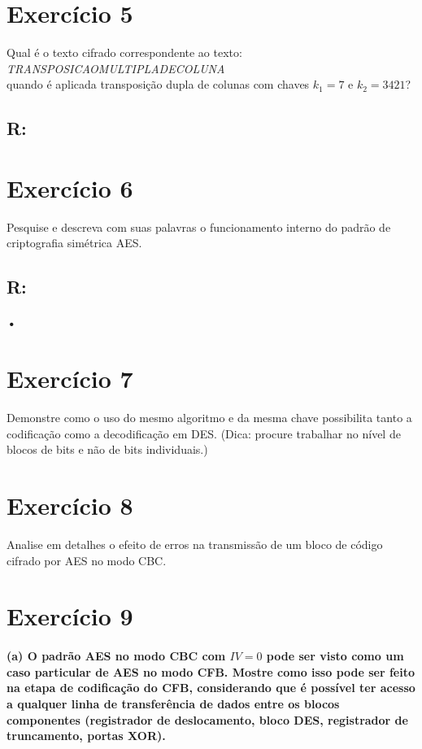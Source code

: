 \documentclass[10pt,a4paper]{article}
\begin{document}
\section*{Exercício 5}
Qual é o texto cifrado correspondente ao texto:\\ \emph{TRANSPOSICAOMULTIPLADECOLUNA}\\ quando é aplicada transposição dupla de colunas com chaves $k_1=7$ e $k_2= 3421$?
\subsection*{R:}
\section*{Exercício 6}
Pesquise e descreva com suas palavras o funcionamento interno do padrão de criptografia simétrica AES.
\subsection*{R:}
\paragraph*{•}
\section*{Exercício 7}
Demonstre como o uso do mesmo algoritmo e da mesma chave possibilita tanto a codificação como a decodificação em DES. (Dica: procure trabalhar no nível de blocos de bits e não de bits individuais.)
\section*{Exercício 8}
Analise em detalhes o efeito de erros na transmissão de um bloco de código cifrado por AES no modo CBC.
\section*{Exercício 9}
\paragraph*{(a) O padrão AES no modo CBC com $IV=0$ pode ser visto como um caso particular de AES no modo CFB. Mostre como isso pode ser feito na etapa de codificação do CFB, considerando que é possível ter acesso a qualquer linha de transferência de dados entre os blocos componentes (registrador de deslocamento, bloco DES, registrador de truncamento, portas XOR).}
\end{document}
